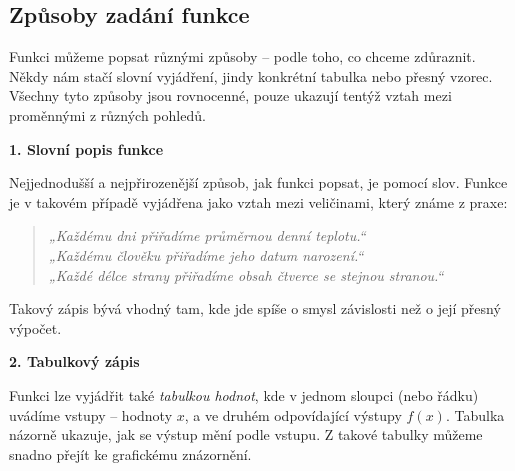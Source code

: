 \documentclass[12pt,a4paper]{article}
\begin{document}
\subsection{Způsoby zadání funkce}

Funkci můžeme popsat různými způsoby – podle toho, co chceme zdůraznit.  
Někdy nám stačí slovní vyjádření, jindy konkrétní tabulka nebo přesný vzorec.  
Všechny tyto způsoby jsou rovnocenné, pouze ukazují tentýž vztah mezi proměnnými z různých pohledů.

\medskip
\textbf{1. Slovní popis funkce}

Nejjednodušší a nejpřirozenější způsob, jak funkci popsat, je pomocí slov.  
Funkce je v takovém případě vyjádřena jako vztah mezi veličinami, který známe z praxe:
\begin{quote}
    \emph{
        „Každému dni přiřadíme průměrnou denní teplotu.“  \\
        „Každému člověku přiřadíme jeho datum narození.“  \\
        „Každé délce strany přiřadíme obsah čtverce se stejnou stranou.“ \\
        } 
\end{quote}

Takový zápis bývá vhodný tam, kde jde spíše o smysl závislosti než o její přesný výpočet.

\medskip
\textbf{2. Tabulkový zápis}

Funkci lze vyjádřit také \emph{tabulkou hodnot}, kde v jednom sloupci (nebo řádku) uvádíme vstupy – hodnoty \(x\), a ve druhém odpovídající výstupy \(f(x)\).  
Tabulka názorně ukazuje, jak se výstup mění podle vstupu.  
Z takové tabulky můžeme snadno přejít ke grafickému znázornění.
\end{document}
